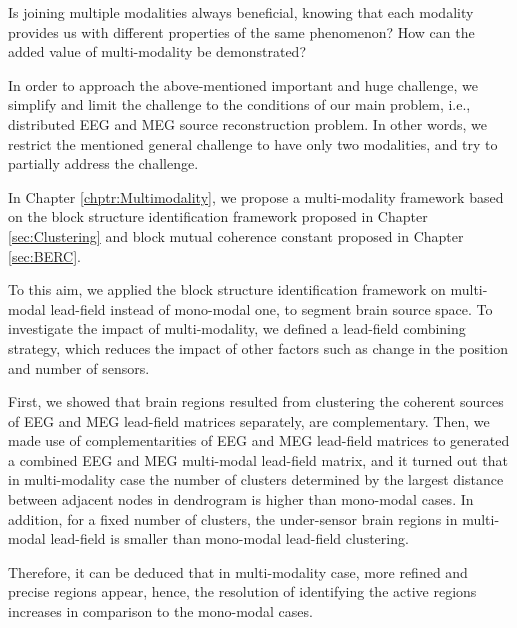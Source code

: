 \begin{tcolorbox}
\begin{challenge}
Is joining multiple modalities always beneficial, knowing that each modality provides us with different properties of the same phenomenon? 
How can the added value of multi-modality be demonstrated?
\end{challenge}
\end{tcolorbox}

In order to approach the above-mentioned important and huge challenge, we simplify and limit the challenge to the conditions of our main problem, i.e., distributed EEG and MEG source reconstruction problem.
In other words, we restrict the mentioned general challenge to have only two modalities, and try to partially address the challenge.

In Chapter \ref{chptr:Multimodality}, we propose a multi-modality framework based on the block structure identification framework proposed in Chapter \ref{sec:Clustering} and block mutual coherence constant proposed in Chapter \ref{sec:BERC}.

To this aim, we applied the block structure identification framework on multi-modal lead-field instead of mono-modal one, to segment brain source space.
To investigate the impact of multi-modality, we defined a lead-field combining strategy, which reduces the impact of other factors such as change in the position and number of sensors.

First, we showed that brain regions resulted from clustering the coherent sources of EEG and MEG lead-field matrices separately, are complementary.
Then, we made use of complementarities of EEG and MEG lead-field matrices to generated a combined EEG and MEG multi-modal lead-field matrix, and it turned out that in multi-modality case the number of clusters determined by the largest distance between adjacent nodes in dendrogram is higher than mono-modal cases. 
In addition, for a fixed number of clusters, the under-sensor brain regions in multi-modal lead-field is smaller than mono-modal lead-field clustering.

Therefore, it can be deduced that in multi-modality case, more refined and precise regions appear, hence, the resolution of identifying the active regions increases in comparison to the mono-modal cases.

